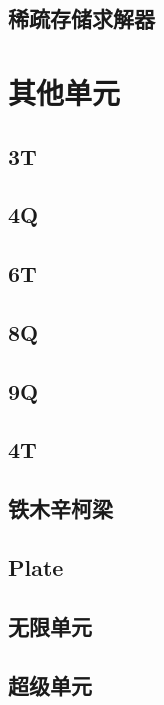 \documentclass[UTF8]{ctexbook}
\begin{document}
\subsection{稀疏存储求解器}

\section{其他单元}
\subsection{3T}

\subsection{4Q}

\subsection{6T}

\subsection{8Q}

\subsection{9Q}

\subsection{4T}

\subsection{铁木辛柯梁}

\subsection{Plate}

\subsection{无限单元}

\subsection{超级单元}
\end{document}
